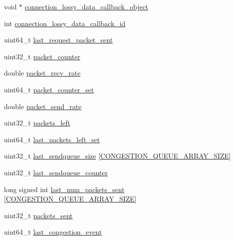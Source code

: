 \begin{DoxyCompactItemize}
\item 
void $\ast$ \hyperlink{struct_crypto___connection_a70a99b7d0c9dd2f913ca9ea42bafc942}{connection\+\_\+lossy\+\_\+data\+\_\+callback\+\_\+object}
\item 
int \hyperlink{struct_crypto___connection_acdd49847729119bc5d6cc7269cde876a}{connection\+\_\+lossy\+\_\+data\+\_\+callback\+\_\+id}
\item 
uint64\+\_\+t \hyperlink{struct_crypto___connection_aa0c15e9ada39b9e8d1f27e2a10ad2e0e}{last\+\_\+request\+\_\+packet\+\_\+sent}
\item 
uint32\+\_\+t \hyperlink{struct_crypto___connection_a253e0640ca1d914e479ea37e97d1ba12}{packet\+\_\+counter}
\item 
double \hyperlink{struct_crypto___connection_ae1c1fa0c995f0fab590b094baa769e8d}{packet\+\_\+recv\+\_\+rate}
\item 
uint64\+\_\+t \hyperlink{struct_crypto___connection_a77c1105a8f0d4de4daab379a572bb11c}{packet\+\_\+counter\+\_\+set}
\item 
double \hyperlink{struct_crypto___connection_a8358768a02871910ed059b1b2646438e}{packet\+\_\+send\+\_\+rate}
\item 
uint32\+\_\+t \hyperlink{struct_crypto___connection_adfabcbe80305cc6b4e1c0dfef5c48653}{packets\+\_\+left}
\item 
uint64\+\_\+t \hyperlink{struct_crypto___connection_a3c50560fad9a00689d5d3f143f4b56aa}{last\+\_\+packets\+\_\+left\+\_\+set}
\item 
uint32\+\_\+t \hyperlink{struct_crypto___connection_a0157f7d2fcd3f9d92521930547ddaae6}{last\+\_\+sendqueue\+\_\+size} \mbox{[}\hyperlink{net__crypto_8h_a0f273efcbb427d7ab96d56de4de63137}{C\+O\+N\+G\+E\+S\+T\+I\+O\+N\+\_\+\+Q\+U\+E\+U\+E\+\_\+\+A\+R\+R\+A\+Y\+\_\+\+S\+I\+Z\+E}\mbox{]}
\item 
uint32\+\_\+t \hyperlink{struct_crypto___connection_a9fff7889476ca9104b603dd03781e0c9}{last\+\_\+sendqueue\+\_\+counter}
\item 
long signed int \hyperlink{struct_crypto___connection_aa6d1d107adcffe30564bf3837faefca4}{last\+\_\+num\+\_\+packets\+\_\+sent} \mbox{[}\hyperlink{net__crypto_8h_a0f273efcbb427d7ab96d56de4de63137}{C\+O\+N\+G\+E\+S\+T\+I\+O\+N\+\_\+\+Q\+U\+E\+U\+E\+\_\+\+A\+R\+R\+A\+Y\+\_\+\+S\+I\+Z\+E}\mbox{]}
\item 
uint32\+\_\+t \hyperlink{struct_crypto___connection_ad51d37ac38989c1d089da8aa0d1bc1d7}{packets\+\_\+sent}
\item 
uint64\+\_\+t \hyperlink{struct_crypto___connection_ad33f09e937800c05f22fa695e756554d}{last\+\_\+congestion\+\_\+event}

\end{DoxyCompactItemize}
